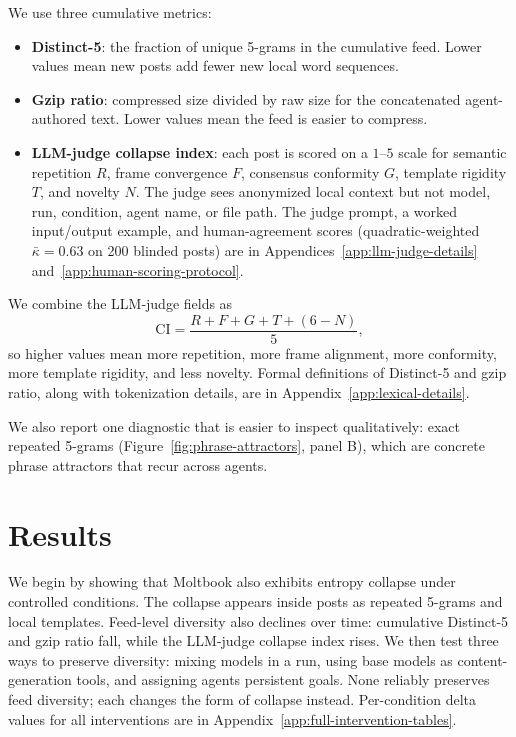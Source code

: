 \documentclass[11pt]{article}
\begin{document}
We use three cumulative metrics:
\begin{itemize}
\setlength{\itemsep}{2pt}
\item \textbf{Distinct-5}: the fraction of unique 5-grams in the cumulative feed. Lower values mean new posts add fewer new local word sequences.
\item \textbf{Gzip ratio}: compressed size divided by raw size for the concatenated agent-authored text. Lower values mean the feed is easier to compress.
\item \textbf{LLM-judge collapse index}: each post is scored on a $1$--$5$ scale for semantic repetition $R$, frame convergence $F$, consensus conformity $G$, template rigidity $T$, and novelty $N$. The judge sees anonymized local context but not model, run, condition, agent name, or file path. The judge prompt, a worked input/output example, and human-agreement scores (quadratic-weighted $\bar\kappa=0.63$ on 200 blinded posts) are in Appendices~\ref{app:llm-judge-details} and~\ref{app:human-scoring-protocol}.
\end{itemize}
We combine the LLM-judge fields as
\begin{equation}
\mathrm{CI} = \frac{R + F + G + T + (6 - N)}{5},
\label{eq:ci}
\end{equation}
so higher values mean more repetition, more frame alignment, more conformity, more template rigidity, and less novelty. Formal definitions of Distinct-5 and gzip ratio, along with tokenization details, are in Appendix~\ref{app:lexical-details}.

We also report one diagnostic that is easier to inspect qualitatively: exact repeated 5-grams (Figure~\ref{fig:phrase-attractors}, panel B), which are concrete phrase attractors that recur across agents.


\section{Results}
\label{sec:results}


We begin by showing that Moltbook also exhibits entropy collapse under controlled conditions. The collapse appears inside posts as repeated 5-grams and local templates. Feed-level diversity also declines over time: cumulative Distinct-5 and gzip ratio fall, while the LLM-judge collapse index rises. We then test three ways to preserve diversity: mixing models in a run, using base models as content-generation tools, and assigning agents persistent goals. None reliably preserves feed diversity; each changes the form of collapse instead. Per-condition delta values for all interventions are in Appendix~\ref{app:full-intervention-tables}.
\end{document}
